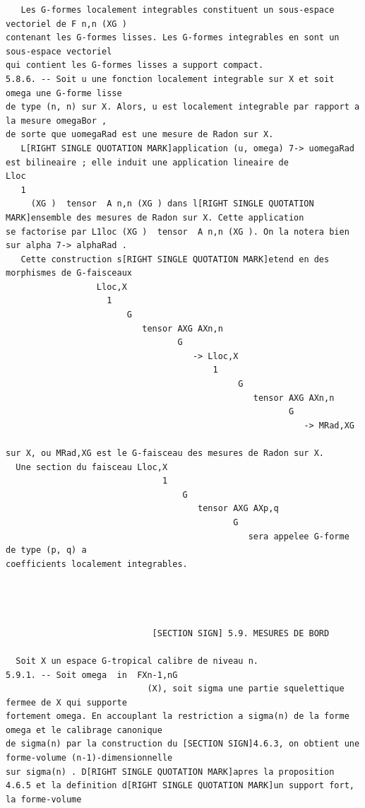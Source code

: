 \documentclass[
  11pt,
]{article}
\begin{document}
\begin{lstlisting}
   Les G-formes localement integrables constituent un sous-espace vectoriel de F n,n (XG )
contenant les G-formes lisses. Les G-formes integrables en sont un sous-espace vectoriel
qui contient les G-formes lisses a support compact.
5.8.6. -- Soit u une fonction localement integrable sur X et soit omega une G-forme lisse
de type (n, n) sur X. Alors, u est localement integrable par rapport a la mesure omegaBor ,
de sorte que uomegaRad est une mesure de Radon sur X.
   L[RIGHT SINGLE QUOTATION MARK]application (u, omega) 7-> uomegaRad est bilineaire ; elle induit une application lineaire de
Lloc
   1
     (XG )  tensor  A n,n (XG ) dans l[RIGHT SINGLE QUOTATION MARK]ensemble des mesures de Radon sur X. Cette application
se factorise par L1loc (XG )  tensor  A n,n (XG ). On la notera bien sur alpha 7-> alphaRad .
   Cette construction s[RIGHT SINGLE QUOTATION MARK]etend en des morphismes de G-faisceaux
                  Lloc,X
                    1
                        G
                           tensor AXG AXn,n
                                  G
                                     -> Lloc,X
                                         1
                                              G
                                                 tensor AXG AXn,n
                                                        G
                                                           -> MRad,XG

sur X, ou MRad,XG est le G-faisceau des mesures de Radon sur X.
  Une section du faisceau Lloc,X
                               1
                                   G
                                      tensor AXG AXp,q
                                             G
                                                sera appelee G-forme de type (p, q) a
coefficients localement integrables.




                             [SECTION SIGN] 5.9. MESURES DE BORD

  Soit X un espace G-tropical calibre de niveau n.
5.9.1. -- Soit omega  in  FXn-1,nG
                            (X), soit sigma une partie squelettique fermee de X qui supporte
fortement omega. En accouplant la restriction a sigma(n) de la forme omega et le calibrage canonique
de sigma(n) par la construction du [SECTION SIGN]4.6.3, on obtient une forme-volume (n-1)-dimensionnelle
sur sigma(n) . D[RIGHT SINGLE QUOTATION MARK]apres la proposition 4.6.5 et la definition d[RIGHT SINGLE QUOTATION MARK]un support fort, la forme-volume
\end{lstlisting}
\end{document}
